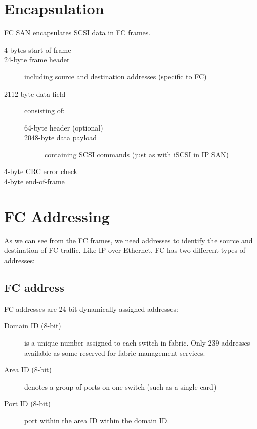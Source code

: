 \documentclass[slides]{pgnotes}
\begin{document}


\section{Encapsulation}\label{encapsulation}

FC SAN encapsulates SCSI data in FC frames.

\begin{description}
\item[4-bytes start-of-frame]
\item[24-byte frame header]
including source and destination addresses (specific to FC)
\item[2112-byte data field]
consisting of:

\begin{description}
\item[64-byte header (optional)]
\item[2048-byte data payload]
containing SCSI commands (just as with iSCSI in IP SAN)
\end{description}
\item[4-byte CRC error check]
\item[4-byte end-of-frame]
\end{description}



\section{FC Addressing}
\label{sec:addressing}

As we can see from the FC frames, we need addresses to identify the
source and destination of FC traffic. Like IP over Ethernet, FC has two
different types of addresses:

\subsection{FC address}
\label{sec:fc-address}

FC addresses are 24-bit dynamically assigned addresses:

\begin{description}
\item[Domain ID (8-bit)]
is a unique number assigned to each switch in fabric. Only 239 addresses
available as some reserved for fabric management services.
\item[Area ID (8-bit)]
denotes a group of ports on one switch (such as a single card)
\item[Port ID (8-bit)]
port within the area ID within the domain ID.
\end{description}
\end{document}
